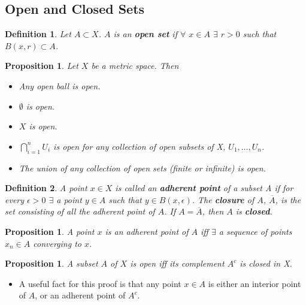 \documentclass[two column]{article}
\newtheorem{proposition}[theorem]{Proposition}
\newtheorem{definition}{Definition}[subsection]
\begin{document}
\subsection{Open and Closed Sets}

\begin{definition}
Let $A \subset X$. $A$ is an {\bf open set} if   $\forall$ $x \in A$ $\exists$ $r>0$ such that $B(x,r) \subset A$. \\
\end{definition}

\begin{proposition}
Let $X$ be a metric space. Then 
\begin{itemize}
\item Any open ball is open.
\item $\emptyset$ is open.
\item $X$ is open. 
\item $\bigcap_{i=1}^{n} U_{i}$ is open for any collection of open subsets of X, $U_{1}, \dots , U_{n}$.
\item The union of any collection of open sets (finite or infinite) is open.\\
\end{itemize}
\end{proposition}

\begin{definition}
A point $x \in X$ is called an {\bf adherent point} of a subset A if for every $\epsilon > 0$ $\exists$ a point $y \in A$ such that $y \in B(x, \epsilon)$. The {\bf closure} of $A$, $\overline{A}$, is the set consisting of all the adherent point of $A$. If $A = \overline{A}$, then $A$ is {\bf closed}. \\
\end{definition}

\begin{proposition}
A point $x$ is an adherent point of $A$ iff $\exists$ a sequence of points $x_{n} \in A$ converging to $x$. \\
\end{proposition}

\begin{proposition}
A subset $A$ of $X$ is open iff its complement $A^{c}$ is closed in X. 
\end{proposition}
\begin{itemize}
\item A useful fact for this proof is that any point $x \in A$ is either an interior point of $A$, or an adherent point of $A^{c}$. 
\end{itemize}
\end{document}
